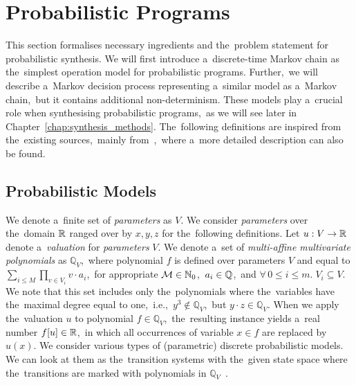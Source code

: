 \chapter{Probabilistic Programs}\label{chap:preliminaries}

This section formalises necessary ingredients and the~problem statement for probabilistic synthesis.
We will first introduce a~discrete-time Markov chain as the~simplest operation model for probabilistic programs.
Further,~we will describe a~Markov decision process representing a~similar model as a~Markov chain,~but it contains additional non-determinism.
These models play a~crucial role when synthesising probabilistic programs,~as we will see later in Chapter~\ref{chap:synthesis_methods}.
The~following definitions are inspired from the~existing sources,~mainly from~\cite{tacas21,Quatmann2016},~where a~more detailed description can also be found.

\section{Probabilistic Models}

We denote a~finite set of \textit{parameters} as $V$.
We consider \textit{parameters} over the~domain $\mathbb{R}$ ranged over by $x,y,z$ for the~following definitions.
Let $u: V \rightarrow \mathbb{R}$ denote a~\textit{valuation} for \textit{parameters} $V$.
We denote a~set of \textit{multi-affine multivariate polynomials} as $\mathbb{Q}_V$,~where polynomial $f$ is defined over parameters $V$ and equal to $\sum_{i \leq M}{\prod_{v\in V_i}v \cdot a_i}$,~for appropriate $\mathcal{M} \in \mathbb{N}_0$,~$a_i \in \mathbb{Q}$,~and $\forall \, 0 \leq i \leq m. \; V_i \subseteq V$.
We note that this set includes only the~polynomials where the~variables have the~maximal degree equal to one,~i.e.,~$y^3 \notin \mathbb{Q}_V$,~but $y \cdot z \in \mathbb{Q}_V$.
When we apply the~valuation $u$ to polynomial $f \in \mathbb{Q}_V$,~the~resulting instance yields a~real number $f[u] \in \mathbb{R}$,~in which all occurrences of variable $x \in f$ are replaced by $u(x)$.
We consider various types of (parametric) discrete probabilistic models.
We can look at them as the~transition systems with the~given state space where the~transitions are marked with polynomials in $\mathbb{Q}_V$~\cite{Quatmann2016}.


